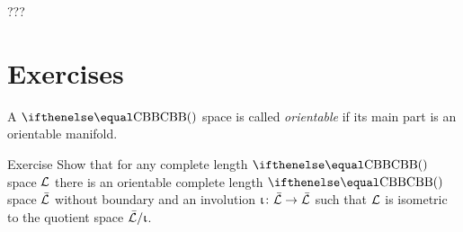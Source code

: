 ???\qeds



\section{Exercises}

A $\Alex{}$ space is called \emph{orientable} if its main part is an orientable manifold.

\begin{thm}{Exercise}
Show that for any  complete length $\Alex{}$ space $\mathcal{L}$ there is an orientable complete length $\Alex{}$ space $\bar{\mathcal{L}}$ without boundary and an involution $\iota\:\bar{\spc{L}}\to\bar{\spc{L}}$
such that $\mathcal{L}$ is isometric to the quotient space $\bar{\mathcal{L}}/\upiota$.
\end{thm}



